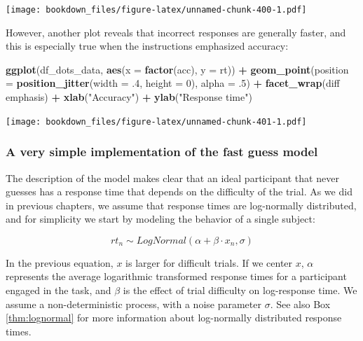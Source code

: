 \documentclass[12pt,]{krantz}
\newenvironment{Shaded}{\begin{snugshade}}{\end{snugshade}}
\newcommand{\KeywordTok}[1]{\textcolor[rgb]{0.13,0.29,0.53}{\textbf{#1}}}
\newcommand{\DataTypeTok}[1]{\textcolor[rgb]{0.13,0.29,0.53}{#1}}
\newcommand{\DecValTok}[1]{\textcolor[rgb]{0.00,0.00,0.81}{#1}}
\newcommand{\FloatTok}[1]{\textcolor[rgb]{0.00,0.00,0.81}{#1}}
\newcommand{\StringTok}[1]{\textcolor[rgb]{0.31,0.60,0.02}{#1}}
\newcommand{\OperatorTok}[1]{\textcolor[rgb]{0.81,0.36,0.00}{\textbf{#1}}}
\newcommand{\NormalTok}[1]{#1}
\theoremstyle{definition}
\theoremstyle{definition}
\theoremstyle{definition}
\theoremstyle{remark}
\begin{document}
\texttt{[image: bookdown\_files/figure-latex/unnamed-chunk-400-1.pdf]}

However, another plot reveals that incorrect responses are generally
faster, and this is especially true when the instructions emphasized
accuracy:

\begin{Shaded}
\begin{Highlighting}[]
\KeywordTok{ggplot}\NormalTok{(df_dots_data, }\KeywordTok{aes}\NormalTok{(}\DataTypeTok{x =} \KeywordTok{factor}\NormalTok{(acc), }\DataTypeTok{y =}\NormalTok{ rt)) }\OperatorTok{+}
\StringTok{  }\KeywordTok{geom_point}\NormalTok{(}\DataTypeTok{position =} \KeywordTok{position_jitter}\NormalTok{(}\DataTypeTok{width =} \FloatTok{.4}\NormalTok{, }\DataTypeTok{height =} \DecValTok{0}\NormalTok{),}
             \DataTypeTok{alpha =} \FloatTok{.5}\NormalTok{) }\OperatorTok{+}
\StringTok{  }\KeywordTok{facet_wrap}\NormalTok{(diff }\OperatorTok{~}\StringTok{ }\NormalTok{emphasis) }\OperatorTok{+}
\StringTok{  }\KeywordTok{xlab}\NormalTok{(}\StringTok{"Accuracy"}\NormalTok{) }\OperatorTok{+}
\StringTok{  }\KeywordTok{ylab}\NormalTok{(}\StringTok{"Response time"}\NormalTok{)}
\end{Highlighting}
\end{Shaded}

\texttt{[image: bookdown\_files/figure-latex/unnamed-chunk-401-1.pdf]}

\subsubsection{A very simple implementation of the fast guess
model}\label{a-very-simple-implementation-of-the-fast-guess-model}

The description of the model makes clear that an ideal participant that
never guesses has a response time that depends on the difficulty of the
trial. As we did in previous chapters, we assume that response times are
log-normally distributed, and for simplicity we start by modeling the
behavior of a single subject:

\begin{equation}
rt_n \sim LogNormal(\alpha + \beta \cdot x_n, \sigma)
\end{equation}

In the previous equation, \(x\) is larger for difficult trials. If we
center \(x\), \(\alpha\) represents the average logarithmic transformed
response times for a participant engaged in the task, and \(\beta\) is
the effect of trial difficulty on log-response time. We assume a
non-deterministic process, with a noise parameter \(\sigma\). See also
Box \ref{thm:lognormal} for more information about log-normally
distributed response times.
\end{document}
